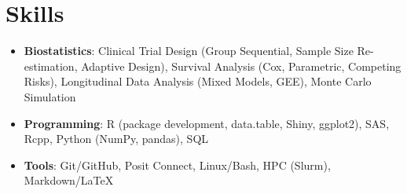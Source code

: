 \documentclass[letterpaper,11pt]{article}
\makeatletter
\newcommand{\resumeItem}[1]{
  \item\small{
    {#1 \vspace{-2pt}}
  }
}
\newcommand{\resumeSubheading}[4]{
  \vspace{-2pt}\item
    \begin{tabular*}{1.0\textwidth}[t]{l@{\extracolsep{\fill}}r}
      \textbf{#1} & \textbf{\small #2} \\
      \textit{\small#3} & \textit{\small #4} \\
    \end{tabular*}\vspace{-8pt}
}
\newcommand{\resumeSubHeadingListStart}{\begin{itemize}[leftmargin=0.0in, label={}]}
\newcommand{\resumeSubHeadingListEnd}{\end{itemize}}
\newcommand{\resumeItemListStart}{\begin{itemize}}
\newcommand{\resumeItemListEnd}{\end{itemize}\vspace{-5pt}}
\makeatother
\begin{document}
\section{Skills}
\begin{itemize}[leftmargin=0.15in, label={}, itemsep=-2pt]
  \small 
  \item \textbf{Biostatistics}{: Clinical Trial Design (Group Sequential, Sample Size Re-estimation, Adaptive Design), Survival Analysis (Cox, Parametric, Competing Risks), Longitudinal Data Analysis (Mixed Models, GEE), Monte Carlo Simulation}
  \item \textbf{Programming}{: R (package development, data.table, Shiny, ggplot2), SAS, Rcpp, Python (NumPy, pandas), SQL} \\
  \item \textbf{Tools}{: Git/GitHub, Posit Connect, Linux/Bash, HPC (Slurm), Markdown/LaTeX}
\end{itemize}


    
        


    
\end{document}
